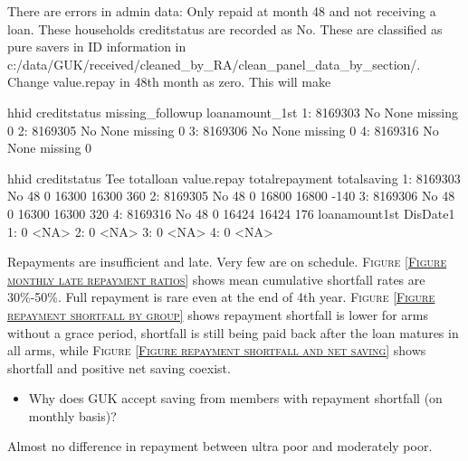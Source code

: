 There are errors in admin data: Only repaid at month 48 and not receiving a loan. These households creditstatus are recorded as No. These are classified as pure savers in ID information in c:/data/GUK/received/cleaned\_by\_RA/clean\_panel\_data\_by\_section/. Change value.repay in 48th month as zero. This will make 
\begin{Schunk}
\begin{Soutput}
      hhid creditstatus missing_followup loanamount_1st
1: 8169303           No     None missing              0
2: 8169305           No     None missing              0
3: 8169306           No     None missing              0
4: 8169316           No     None missing              0
\end{Soutput}
\begin{Soutput}
      hhid creditstatus Tee totalloan value.repay totalrepayment totalsaving
1: 8169303           No  48         0       16300          16300         360
2: 8169305           No  48         0       16800          16800        -140
3: 8169306           No  48         0       16300          16300         320
4: 8169316           No  48         0       16424          16424         176
   loanamount1st DisDate1
1:             0     <NA>
2:             0     <NA>
3:             0     <NA>
4:             0     <NA>
\end{Soutput}
\end{Schunk}





\begin{palepinkleftbar}
\begin{finding}
Repayments are insufficient and late. Very few are on schedule. \textsc{\small Figure \ref{Figure monthly late repayment ratios}} shows mean cumulative shortfall rates are 30\%-50\%. Full repayment is rare even at the end of 4th year. \textsc{\small Figure \ref{Figure repayment shortfall by group}} shows repayment shortfall is lower for arms without a grace period, shortfall is still being paid back after the loan matures in all arms, while \textsc{\small Figure \ref{Figure repayment shortfall and net saving}} shows shortfall and positive net saving coexist.
\end{finding}
\end{palepinkleftbar}
\begin{itemize}
\vspace{1.0ex}\setlength{\itemsep}{1.0ex}\setlength{\baselineskip}{12pt}
\item	Why does GUK accept saving from members with repayment shortfall (on monthly basis)? 
\end{itemize}
\begin{palepinkleftbar}
\begin{finding}
Almost no difference in repayment between ultra poor and moderately poor.
\end{finding}
\end{palepinkleftbar}


